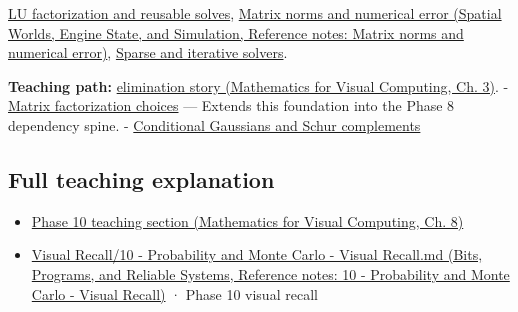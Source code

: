 \hypertarget{appendix-f6e77f4a200f-used-by}{}

\hyperref[appendix-55e4b5b0a1e6]{LU factorization and reusable solves}, \href{../05-Spatial-Worlds-Engine-State-and-Simulation/main.pdf\#nameddest=appendix-f8657bac66e5}{Matrix norms and numerical error (Spatial Worlds, Engine State, and Simulation, Reference notes: Matrix norms and numerical error)}, \hyperref[appendix-67c87a3d9e94]{Sparse and iterative solvers}.

\textbf{Teaching path:} \href{../02-Mathematics-for-Visual-Computing/main.pdf\#nameddest=01-foundations-i-ch019-elimination-turns-the-geometry-into-an-auditable-calculation}{elimination story (Mathematics for Visual Computing, Ch. 3)}. - \hyperref[appendix-221a483bec2d]{Matrix factorization choices} --- Extends this foundation into the Phase 8 dependency spine. - \hyperref[appendix-f0437ea55a47]{Conditional Gaussians and Schur complements}

\subsection{Full teaching explanation}\label{appendix-f6e77f4a200f-full-teaching-explanation}

\hypertarget{appendix-f6e77f4a200f-full-teaching-explanation}{}

\begin{itemize}
\tightlist
\item
  \href{../02-Mathematics-for-Visual-Computing/main.pdf\#nameddest=02-foundations-ii-ch024-waiting-times-event-counts-and-covariance-geometry}{Phase 10 teaching section (Mathematics for Visual Computing, Ch. 8)}
\item
  \href{../01-Bits-Programs-and-Reliable-Systems/main.pdf\#nameddest=appendix-cb5af353ef77}{Visual Recall/10 - Probability and Monte Carlo - Visual Recall.md (Bits, Programs, and Reliable Systems, Reference notes: 10 - Probability and Monte Carlo - Visual Recall)} · Phase 10 visual recall
\end{itemize}
